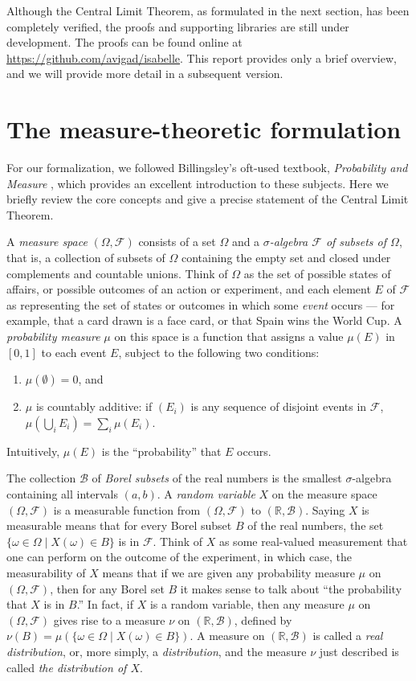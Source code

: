 \documentclass{article}
\newcommand{\RR}{\mathbb{R}}
\newcommand{\st}{ \; | \;}
\newcommand{\mdl}[1]{{\mathcal #1}}
\begin{document}
Although the Central Limit Theorem, as formulated in the next section, has been completely verified, the proofs and supporting libraries are still under development. The proofs can be found online at \url{https://github.com/avigad/isabelle}. This report provides only a brief overview, and we will provide more detail in a subsequent version.


\section{The measure-theoretic formulation}

For our formalization, we followed Billingsley's oft-used textbook, \emph{Probability and Measure} \cite{billingsley:95}, which provides an excellent introduction to these subjects. Here we briefly review the core concepts and give a precise statement of the Central Limit Theorem.

A \emph{measure space} $(\Omega, \mdl F)$ consists of a set $\Omega$ and a \emph{$\sigma$-algebra $\mdl F$ of subsets of $\Omega$}, that is, a collection of subsets of $\Omega$ containing the empty set and closed under complements and countable unions. Think of $\Omega$ as the set of possible states of affairs, or possible outcomes of an action or experiment, and each element $E$ of $\mdl F$ as representing the set of states or outcomes in which some \emph{event} occurs --- for example, that a card drawn is a face card, or that Spain wins the World Cup. A \emph{probability measure} $\mu$ on this space is a function that assigns a value $\mu(E)$ in $[0, 1]$ to each event $E$, subject to the following two conditions:
\begin{enumerate}
 \item $\mu(\emptyset) = 0$, and
 \item $\mu$ is countably additive: if $(E_i)$ is any sequence of disjoint events in $\mdl F$, $\mu(\bigcup_i E_i) = \sum_i \mu(E_i)$.
\end{enumerate}
Intuitively, $\mu(E)$ is the ``probability'' that $E$ occurs. 

The collection $\mdl B$ of \emph{Borel subsets} of the real numbers is the smallest $\sigma$-algebra containing all intervals $(a, b)$. A \emph{random variable} $X$ on the measure space $(\Omega, \mdl F)$ is a measurable function from $(\Omega, \mdl F)$ to $(\RR, \mdl B)$. Saying $X$ is measurable means that for every Borel subset $B$ of the real numbers, the set $\{ \omega \in \Omega \st X(\omega) \in B \}$ is in $\mdl F$. Think of $X$ as some real-valued measurement that one can perform on the outcome of the experiment, in which case, the measurability of $X$ means that if we are given any probability measure $\mu$ on $(\Omega, \mdl F)$, then for any Borel set $B$ it makes sense to talk about ``the probability that $X$ is in $B$.'' In fact, if $X$ is a random variable, then any measure $\mu$ on $(\Omega, \mdl F)$ gives rise to a measure $\nu$ on $(\RR, \mdl B)$, defined by $\nu(B) = \mu ( \{ \omega \in \Omega \st X (\omega) \in B \})$. A measure on $(\RR, \mdl B)$ is called a \emph{real distribution}, or, more simply, a \emph{distribution}, and the measure $\nu$ just described is called \emph{the distribution of $X$}.
\end{document}
